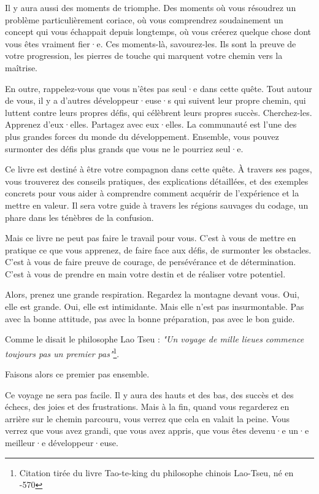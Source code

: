 Il y aura aussi des moments de triomphe. Des moments où vous résoudrez un problème particulièrement coriace, où vous comprendrez soudainement un concept qui vous échappait depuis longtemps, où vous créerez quelque chose dont vous êtes vraiment fier·e. Ces moments-là, savourez-les. Ils sont la preuve de votre progression, les pierres de touche qui marquent votre chemin vers la maîtrise.

En outre, rappelez-vous que vous n'êtes pas seul·e dans cette quête. Tout autour de vous, il y a d'autres développeur·euse·s qui suivent leur propre chemin, qui luttent contre leurs propres défis, qui célèbrent leurs propres succès. Cherchez-les. Apprenez d'eux·elles. Partagez avec eux·elles. La communauté est l'une des plus grandes forces du monde du développement. Ensemble, vous pouvez surmonter des défis plus grands que vous ne le pourriez seul·e.

Ce livre est destiné à être votre compagnon dans cette quête. À travers ses pages, vous trouverez des conseils pratiques, des explications détaillées, et des exemples concrets pour vous aider à comprendre comment acquérir de l'expérience et la mettre en valeur. Il sera votre guide à travers les régions sauvages du codage, un phare dans les ténèbres de la confusion.

Mais ce livre ne peut pas faire le travail pour vous. C'est à vous de mettre en pratique ce que vous apprenez, de faire face aux défis, de surmonter les obstacles. C'est à vous de faire preuve de courage, de persévérance et de détermination. C'est à vous de prendre en main votre destin et de réaliser votre potentiel.

Alors, prenez une grande respiration. Regardez la montagne devant vous. Oui, elle est grande. Oui, elle est intimidante. Mais elle n'est pas insurmontable. Pas avec la bonne attitude, pas avec la bonne préparation, pas avec le bon guide.

Comme le disait le philosophe Lao Tseu : \textit{"Un voyage de mille lieues commence toujours pas un premier pas"}\footnote{Citation tirée du livre Tao-te-king du philosophe chinois Lao-Tseu, né en -570}.

Faisons alors ce premier pas ensemble.

Ce voyage ne sera pas facile. Il y aura des hauts et des bas, des succès et des échecs, des joies et des frustrations. Mais à la fin, quand vous regarderez en arrière sur le chemin parcouru, vous verrez que cela en valait la peine. Vous verrez que vous avez grandi, que vous avez appris, que vous êtes devenu·e un·e meilleur·e développeur·euse.


